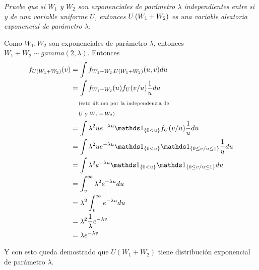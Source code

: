 \emph{
	Pruebe que si $W_1$ y $W_2$  son  exponenciales de par\'ametro 
	$\lambda$  independientes entre si y de una variable uniforme $U$, 
	entonces $U\left( W_1+W_2\right) $ es una variable aleatoria exponencial 
	de par\'ametro $\lambda$.
}

\afterstatement\pn

Como $W_1, W_2$ son exponenciales de parámetro $\lambda$, entonces $W_1 + W_2 \sim gamma(2, \lambda)$.
Entonces
\begin{align}
    f_{U(W_1 + W_2)}(v)     &=  \int    f_{W_1 + W_2, U(W_1 + W_2)}(u, v) du                                                            \\
                            &=  \int    f_{W_1 + W_2}(u) f_{U}(v/u)\frac{1}{u} du                                                       \\
                            &\lcomment{esto último por la independencia de }                                                            \\
                            &\rcomment{$U$ y $W_1 + W_2$}                                                                               \\
                            &=  \int    \lambda^2 u e^{-\lambda u} \indic_{\{0 < u\}} f_{U}(v/u)\frac{1}{u} du                          \\
                            &=  \int    \lambda^2 u e^{-\lambda u} \indic_{\{0 < u\}} \indic_{\{0 \leq v/u \leq 1\}}\frac{1}{u} du      \\
                            &=  \int    \lambda^2 e^{-\lambda u} \indic_{\{0 < u\}} \indic_{\{0 \leq v/u \leq 1\}} du                   \\
                            &=  \int_v^\infty \lambda^2 e^{-\lambda u}  du                                                              \\
                            &=  \lambda^2 \int_v^\infty e^{-\lambda u}  du                                                              \\
                            &=  \lambda^2 \frac{1}{\lambda} e^{-\lambda v}                                                              \\
                            &=  \lambda e^{-\lambda v}                                                                                  
\end{align}

Y con esto queda demostrado que $U(W_1 + W_2)$ tiene distribución exponencial de parámetro $\lambda$.